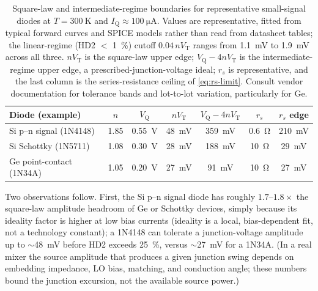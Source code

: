 \documentclass[12pt]{article}
\newcommand{\VT}{V_{\mathrm{T}}}
\newcommand{\VQ}{V_{\mathrm{Q}}}
\newcommand{\IQ}{I_{\mathrm{Q}}}
\begin{document}
\begin{table}[H]
\centering
\renewcommand{\arraystretch}{1.3}
\setlength{\tabcolsep}{5pt}
\caption{Square-law and intermediate-regime boundaries for representative small-signal diodes at $T = \SI{300}{\kelvin}$ and $\IQ \approx \SI{100}{\micro\ampere}$. Values are representative, fitted from typical forward curves and SPICE models rather than read from datasheet tables; the linear-regime (HD2 $<$ \SI{1}{\percent}) cutoff $0.04\,n\VT$ ranges from \SI{1.1}{\milli\volt} to \SI{1.9}{\milli\volt} across all three. $n\VT$ is the square-law upper edge; $\VQ - 4n\VT$ is the intermediate-regime upper edge, a prescribed-junction-voltage ideal; $r_s$ is representative, and the last column is the series-resistance ceiling of \eqref{eq:rs-limit}. Consult vendor documentation for tolerance bands and lot-to-lot variation, particularly for Ge.}
\label{tab:diode-numbers}

\vspace{1\baselineskip}

\small
\begin{tabular}{l c c c c c c}
\toprule
\textbf{Diode (example)} & $n$ & $\VQ$ & $n\VT$ & $\VQ - 4n\VT$ & $r_s$ & $r_s$ edge \\
\midrule
Si p--n signal (1N4148)        & 1.85 & \SI{0.55}{\volt} & \SI{48}{\milli\volt} & \SI{359}{\milli\volt} & \SI{0.6}{\ohm} & \SI{210}{\milli\volt} \\
Si Schottky (1N5711)         & 1.08 & \SI{0.30}{\volt} & \SI{28}{\milli\volt} & \SI{188}{\milli\volt} & \SI{10}{\ohm} & \SI{29}{\milli\volt} \\
Ge point-contact (1N34A)     & 1.05 & \SI{0.20}{\volt} & \SI{27}{\milli\volt} & \SI{91}{\milli\volt} & \SI{10}{\ohm} & \SI{27}{\milli\volt} \\
\bottomrule
\end{tabular}
\end{table}

\FloatBarrier

Two observations follow. First, the Si p--n signal diode has roughly $1.7$--$1.8\times$ the square-law amplitude headroom of Ge or Schottky devices, simply because its ideality factor is higher at low bias currents (ideality is a local, bias-dependent fit, not a technology constant); a 1N4148 can tolerate a junction-voltage amplitude up to $\sim$\SI{48}{\milli\volt} before HD2 exceeds \SI{25}{\percent}, versus $\sim$\SI{27}{\milli\volt} for a 1N34A. (In a real mixer the source amplitude that produces a given junction swing depends on embedding impedance, LO bias, matching, and conduction angle; these numbers bound the junction excursion, not the available source power.)
\end{document}
